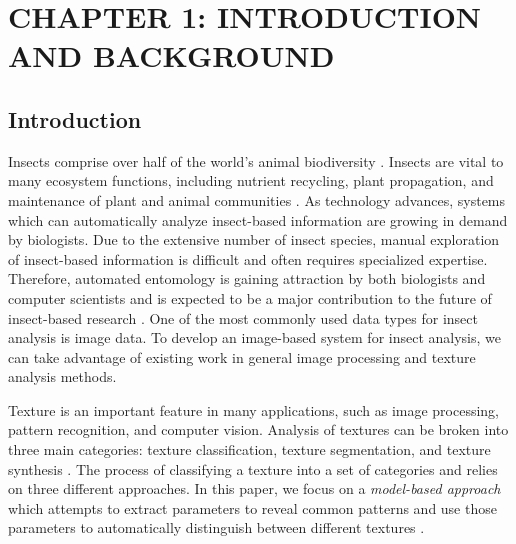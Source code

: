 \documentclass[12pt]{article}
\begin{document}
\begin{center}
    \listoftables
\end{center}
\newpage

\setlength{\parskip}{\baselineskip}

\section{CHAPTER 1: INTRODUCTION AND BACKGROUND}
\subsection{Introduction}

Insects comprise over half of the world's animal biodiversity
\cite{tihelka_evolution_2021}. Insects are vital to many ecosystem functions,
including nutrient recycling, plant propagation, and maintenance of plant and
animal communities \cite{gullan_insects_2009, berenbaum_bugs_1996}. As technology
advances, systems which can automatically analyze insect-based information are
growing in demand by biologists. Due to the extensive number of insect species,
manual exploration of insect-based information is difficult and often requires
specialized expertise. Therefore, automated entomology is gaining attraction by
both biologists and computer scientists and is expected to be a major
contribution to the future of insect-based research
\cite{martineau_survey_2017}. One of the most commonly used data types for
insect analysis is image data. To develop an image-based system for insect
analysis, we can take advantage of existing work in general image processing and
texture analysis methods.

Texture is an important feature in many applications, such as image processing,
pattern recognition, and computer vision. Analysis of textures can be broken
into three main categories: texture classification, texture segmentation, and
texture synthesis \cite{reed_review_1993}. The process of classifying a texture
into a set of categories and relies on three different approaches. In this
paper, we focus on a \textit{model-based approach} which attempts to extract
parameters to reveal common patterns and use those parameters to automatically
distinguish between different textures \cite{maillard_texture_2003}.
\end{document}
